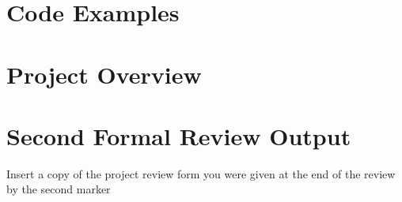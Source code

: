 \begin{appendices}
    \section{Code Examples}

    
    
    
    

    
    
    

    
    

    

    
    
    

    \section{Project Overview}

    

    \section{Second Formal Review Output}
    Insert a copy of the project review form you were given at the end of the review by the second marker


\end{appendices}
